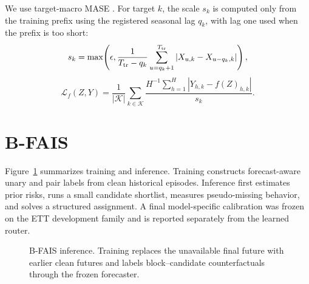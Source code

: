 \documentclass{article}
\newcommand{\bfais}{\textsc{B-FAIS}\xspace}
\begin{document}
We use target-macro MASE \citep{hyndman2006another}. For target $k$, the scale $s_k$ is computed only from the training prefix using the registered seasonal lag $q_k$, with lag one used when the prefix is too short:
\begin{equation}
s_k=\max\!\left(\epsilon,\frac{1}{T_{\rm tr}-q_k}
\sum_{u=q_k+1}^{T_{\rm tr}}|X_{u,k}-X_{u-q_k,k}|\right),
\end{equation}
\begin{equation}
\mathcal L_f(Z,Y)=\frac{1}{|\mathcal K|}\sum_{k\in\mathcal K}
\frac{H^{-1}\sum_{h=1}^{H}|Y_{h,k}-f(Z)_{h,k}|}{s_k}.
\end{equation}

\section{B-FAIS}
\label{sec:method}

Figure~\ref{fig:overview} summarizes training and inference. Training constructs forecast-aware unary and pair labels from clean historical episodes. Inference first estimates prior risks, runs a small candidate shortlist, measures pseudo-missing behavior, and solves a structured assignment. A final model-specific calibration was frozen on the ETT development family and is reported separately from the learned router.

\begin{figure}[t]
\centering
{}
\caption{\bfais inference. Training replaces the unavailable final future with earlier clean futures and labels block--candidate counterfactuals through the frozen forecaster.}
\label{fig:overview}
\end{figure}
\end{document}
